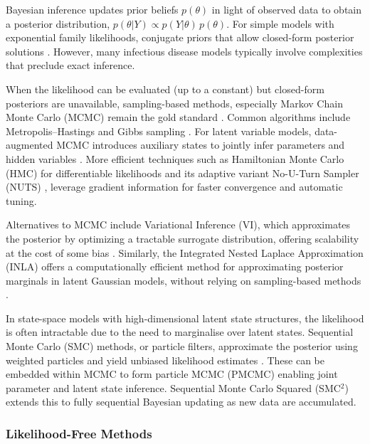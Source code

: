 \documentclass{article}
\begin{document}
Bayesian inference updates prior beliefs $ p(\theta)$ in light of observed data to obtain a posterior distribution, $p(\theta | Y) \propto p(Y|\theta) \,p(\theta)$. For simple models with exponential family likelihoods, conjugate priors that allow closed-form posterior solutions \citep{gelman1995bayesian,  cori2013new}. However, many infectious disease models typically involve complexities that preclude exact inference.

When the likelihood can be evaluated (up to a constant) but closed-form posteriors are unavailable, sampling-based methods, especially Markov Chain Monte Carlo (MCMC) remain the gold standard \citep{gilks1995markov, lekone2006statistical}. Common algorithms include Metropolis–Hastings \citep{hastings1970monte} and Gibbs sampling \citep{geman1984stochastic}. For latent variable models, data-augmented MCMC introduces auxiliary states to jointly infer parameters and hidden variables \citep{o1999bayesian}. More efficient techniques such as Hamiltonian Monte Carlo (HMC) for differentiable likelihoods \citep{duane1987hybrid} and its adaptive variant No-U-Turn Sampler (NUTS) \citep{hoffman2014no, andrade2020evaluation}, leverage gradient information for faster convergence and automatic tuning. 

Alternatives to MCMC include Variational Inference (VI), which approximates the posterior by optimizing a tractable surrogate distribution, offering scalability at the cost of some bias \citep{blei2017variational, chatzilena2019contemporary}. Similarly, the Integrated Nested Laplace Approximation (INLA) 
offers a computationally efficient method for approximating posterior marginals in latent Gaussian models, without relying on sampling-based methods \citep{rue2017bayesian}.

In state-space models with high-dimensional latent state structures, the likelihood is often intractable due to the need to marginalise over latent states. Sequential Monte Carlo (SMC) methods, or particle filters, approximate the posterior using weighted particles and yield unbiased likelihood estimates \citep{doucet2001introduction}. These can be embedded within MCMC to form particle MCMC (PMCMC) \citep{andrieu2010particle, endo2019introduction} enabling joint parameter and latent state inference. Sequential Monte Carlo Squared (SMC$^2$) \citep{chopin2013smc2} extends this to fully sequential Bayesian updating as new data are accumulated.

\subsubsection{Likelihood-Free Methods}
\end{document}
